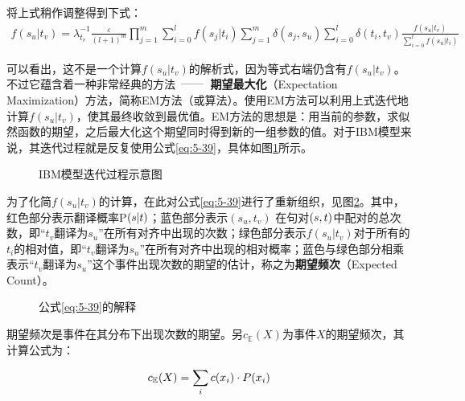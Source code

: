 \parinterval 将上式稍作调整得到下式：
\begin{eqnarray}
f(s_u|t_v) = \lambda_{t_v}^{-1} \frac{\varepsilon}{(l+1)^{m}} \prod\limits_{j=1}^{m} \sum\limits_{i=0}^{l} f(s_j|t_i) \sum\limits_{j=1}^{m} \delta(s_j,s_u) \sum\limits_{i=0}^{l} \delta(t_i,t_v) \frac{f(s_u|t_v) }{\sum\limits_{i=0}^{l}f(s_u|t_i)}
\label{eq:5-39}
\end{eqnarray}

\parinterval  可以看出，这不是一个计算$f(s_u|t_v)$的解析式，因为等式右端仍含有$f(s_u|t_v)$。不过它蕴含着一种非常经典的方法\ $\dash$\ {\small\sffamily\bfseries{期望最大化}}（Expectation Maximization）方法，简称EM方法（或算法）。使用EM方法可以利用上式迭代地计算$f(s_u|t_v)$，使其最终收敛到最优值。EM方法的思想是：用当前的参数，求似然函数的期望，之后最大化这个期望同时得到新的一组参数的值。对于IBM模型来说，其迭代过程就是反复使用公式\eqref{eq:5-39}，具体如图\ref{fig:5-24}所示。

\begin{figure}[htp]
    \centering

   \caption{IBM模型迭代过程示意图}
   \label{fig:5-24}
\end{figure}

\parinterval 为了化简$f(s_u|t_v)$的计算，在此对公式\eqref{eq:5-39}进行了重新组织，见图\ref{fig:5-25}。其中，红色部分表示翻译概率P$({s}|{t})$；蓝色部分表示$(s_u,t_v)$ 在句对$({s},{t})$中配对的总次数，即“$t_v$翻译为$s_u$”在所有对齐中出现的次数；绿色部分表示$f(s_u|t_v)$对于所有的$t_i$的相对值，即“$t_v$翻译为$s_u$”在所有对齐中出现的相对概率；蓝色与绿色部分相乘表示“$t_v$翻译为$s_u$”这个事件出现次数的期望的估计，称之为{\small\sffamily\bfseries{期望频次}}（Expected Count）。
\vspace{-0.3em}
\begin{figure}[htp]
    \centering

   \caption{公式\eqref{eq:5-39}的解释}
   \label{fig:5-25}
\end{figure}

\parinterval 期望频次是事件在其分布下出现次数的期望。另$c_{\mathbb{E}}(X)$为事件$X$的期望频次，其计算公式为：

\begin{equation}
c_{\mathbb{E}}(X)=\sum_i c(x_i) \cdot {P}(x_i)
\end{equation}

